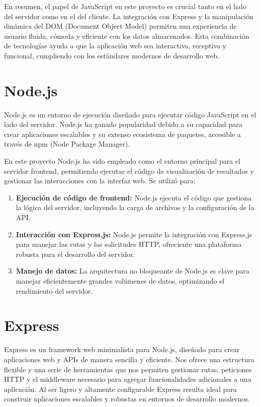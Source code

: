 \documentclass[a4paper, 12pt]{book}
\begin{document}
En resumen, el papel de JavaScript en este proyecto es crucial tanto en el lado del servidor como en el del cliente. La integración con Express y la manipulación dinámica del DOM (Document Object Model) permiten una experiencia de usuario fluida, cómoda y eficiente con los datos almacenados. Esta combinación de tecnologías ayuda a que la aplicación web sea interactiva, receptiva y funcional, cumpliendo con los estándares modernos de desarrollo web.

\section{Node.js}
Node.js es un entorno de ejecución diseñado para ejecutar código JavaScript en el lado del servidor. Node.js ha ganado popularidad debido a su capacidad para crear aplicaciones escalables y su extenso ecosistema de paquetes, accesible a través de npm (Node Package Manager).

En este proyecto Node.js ha sido empleado como el entorno principal para el servidor frontend, permitiendo ejecutar el código de visualización de resultados y gestionar las interacciones con la interfaz web. Se utilizó para:

\begin{enumerate}
    \item \textbf{Ejecución de código de frontend:} Node.js ejecuta el código que gestiona la lógica del servidor, incluyendo la carga de archivos y la configuración de la API.
    \item \textbf{Interacción con Express.js:} Node.js permite la integración con Express.js para manejar las rutas y las solicitudes HTTP, ofreciente una plataforma robusta para el desarrollo del servidor.
    \item \textbf{Manejo de datos:} La arquitectura no bloqueante de Node.js es clave para manejar eficientemente grandes volúmenes de datos, optimizando el rendimiento del servidor.
\end{enumerate}

\section{Express}
Express es un framework web minimalista para Node.js, diseñado para crear aplicaciones web y APIs de manera sencilla y eficiente. Nos ofrece una estructura flexible y una serie de herramientas que nos permiten gestionar rutas, peticiones HTTP y el middleware necesario para agregar funcionalidades adicionales a una aplicación. Al ser ligero y altamente configurable Express resulta ideal para construir aplicaciones escalables y robustas en entornos de desarrollo modernos.
\end{document}
